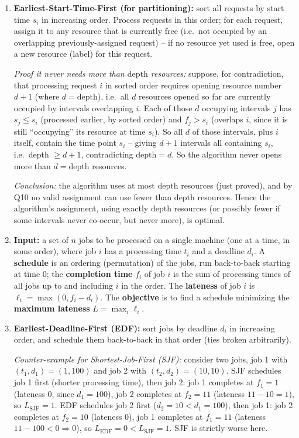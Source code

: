 \documentclass[11pt]{article}
\begin{document}
\begin{enumerate}[label=\textbf{A\arabic*.}, leftmargin=2.2em]
\item \textbf{Earliest-Start-Time-First (for partitioning):} sort all requests by start
time $s_i$ in increasing order. Process requests in this order; for each request,
assign it to any resource that is currently free (i.e.\ not occupied by an
overlapping previously-assigned request) -- if no resource yet used is free, open a new
resource (label) for this request.

\textit{Proof it never needs more than $\mathrm{depth}$ resources:} suppose, for
contradiction, that processing request $i$ in sorted order requires opening resource
number $d+1$ (where $d = \mathrm{depth}$), i.e.\ all $d$ resources opened so far are
currently occupied by intervals overlapping $i$. Each of those $d$ occupying intervals
$j$ has $s_j \le s_i$ (processed earlier, by sorted order) and $f_j > s_i$ (overlaps $i$,
since it is still ``occupying'' its resource at time $s_i$). So all $d$ of those
intervals, plus $i$ itself, contain the time point $s_i$ -- giving $d+1$ intervals all
containing $s_i$, i.e.\ depth $\ge d+1$, contradicting $\mathrm{depth} = d$. So the
algorithm never opens more than $d = \mathrm{depth}$ resources.

\textit{Conclusion:} the algorithm uses at most $\mathrm{depth}$ resources (just proved),
and by Q10 no valid assignment can use fewer than $\mathrm{depth}$ resources. Hence the
algorithm's assignment, using exactly $\mathrm{depth}$ resources (or possibly fewer if
some intervals never co-occur, but never more), is optimal.

\item \textbf{Input:} a set of $n$ jobs to be processed on a single machine (one at a
time, in some order), where job $i$ has a processing time $t_i$ and a deadline $d_i$. A
\textbf{schedule} is an ordering (permutation) of the jobs, run back-to-back starting at
time 0; the \textbf{completion time} $f_i$ of job $i$ is the sum of processing times of
all jobs up to and including $i$ in the order. The \textbf{lateness} of job $i$ is
$\ell_i = \max(0, f_i - d_i)$. The \textbf{objective} is to find a schedule minimizing the
\textbf{maximum lateness} $L = \max_i \ell_i$.

\item \textbf{Earliest-Deadline-First (EDF):} sort jobs by deadline $d_i$ in increasing
order, and schedule them back-to-back in that order (ties broken arbitrarily).

\textit{Counter-example for Shortest-Job-First (SJF):} consider two jobs, job 1 with
$(t_1, d_1) = (1, 100)$ and job 2 with $(t_2, d_2) = (10, 10)$. SJF schedules job 1 first
(shorter processing time), then job 2: job 1 completes at $f_1=1$ (lateness $0$, since
$d_1=100$), job 2 completes at $f_2 = 11$ (lateness $11-10=1$), so $L_{\text{SJF}} = 1$.
EDF schedules job 2 first ($d_2=10 < d_1=100$), then job 1: job 2 completes at $f_2=10$
(lateness $0$), job 1 completes at $f_1=11$ (lateness $11-100 < 0 \Rightarrow 0$), so
$L_{\text{EDF}} = 0 < L_{\text{SJF}} = 1$. SJF is strictly worse here.


\end{enumerate}
\end{document}
